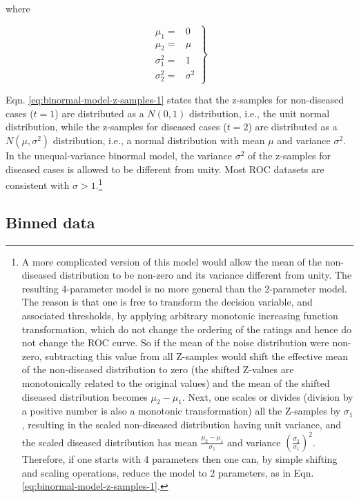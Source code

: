 \documentclass[
]{book}
\begin{document}
where

\begin{equation} 
\left.
\begin{aligned}
\mu_1=&0\\
\mu_2=&\mu\\
\sigma_{1}^{2}=&1\\
\sigma_{2}^{2}=&\sigma^{2}
\end{aligned}
\right \}
\label{eq:binormal-model-z-samples-2}
\end{equation}

Eqn. \eqref{eq:binormal-model-z-samples-1} states that the z-samples for non-diseased cases (\(t = 1\)) are distributed as a \(N(0,1)\) distribution, i.e., the unit normal distribution, while the z-samples for diseased cases (\(t = 2\)) are distributed as a \(N(\mu,\sigma^2)\) distribution, i.e., a normal distribution with mean \(\mu\) and variance \(\sigma^2\). In the unequal-variance binormal model, the variance \(\sigma^2\) of the z-samples for diseased cases is allowed to be different from unity. Most ROC datasets are consistent with \(\sigma > 1\).\footnote{A more complicated version of this model would allow the mean of the non-diseased distribution to be non-zero and its variance different from unity. The resulting 4-parameter model is no more general than the 2-parameter model. The reason is that one is free to transform the decision variable, and associated thresholds, by applying arbitrary monotonic increasing function transformation, which do not change the ordering of the ratings and hence do not change the ROC curve. So if the mean of the noise distribution were non-zero, subtracting this value from all Z-samples would shift the effective mean of the non-diseased distribution to zero (the shifted Z-values are monotonically related to the original values) and the mean of the shifted diseased distribution becomes \(\mu_2-\mu_1\). Next, one scales or divides (division by a positive number is also a monotonic transformation) all the Z-samples by \(\sigma_1\), resulting in the scaled non-diseased distribution having unit variance, and the scaled diseased distribution has mean \(\frac{\mu_2-\mu_1}{\sigma_1}\) and variance \((\frac{\sigma_2}{\sigma_1})^2\). Therefore, if one starts with 4 parameters then one can, by simple shifting and scaling operations, reduce the model to 2 parameters, as in Eqn. \eqref{eq:binormal-model-z-samples-1}.}

\hypertarget{binned-data}{%
\subsection{Binned data}\label{binned-data}}
\end{document}
